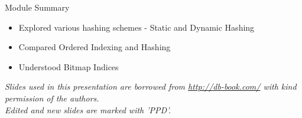 \documentclass[aspectratio=169, xcolor=dvipsnames]{beamer}
\begin{document}
\begin{frame}{Module Summary}
    \begin{block}{}
        \begin{itemize}[<+->]
            \item Explored various hashing schemes - Static and Dynamic Hashing
            \item Compared Ordered Indexing and Hashing
            \item Understood Bitmap Indices
        \end{itemize}
    \end{block}
    \vspace{2em}
    \begin{center}
    \small \textit{Slides used in this presentation are borrowed from \url{http://db-book.com/} with kind permission of the authors.} \\
    \small \textit{Edited and new slides are marked with 'PPD'.}
    \end{center}
\end{frame}
\end{document}

